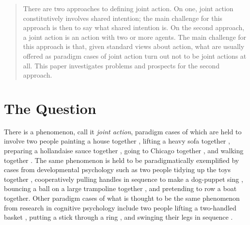 \documentclass[12pt,a4paper]{extarticle}
\begin{document}
\setlength\footnotesep{1em}


\maketitle

\begin{abstract}
There are two approaches to defining joint action.
On one, joint action constitutively involves shared intention; the main challenge for this approach is then to say what shared intention is.
On the second approach, a joint action is an action with two or more agents.  
The main challenge for this approach is that, given standard views about action, what are usually offered as paradigm cases of joint action turn out not to be joint actions at all.
This paper investigates problems and prospects for the second approach.



\end{abstract}




\section{The Question}
There is a phenomenon, call it \emph{joint action}, paradigm cases of which are held to involve two people 
	painting a house together \citep{Bratman:1992mi}, 
	lifting a heavy sofa together \citep{Velleman:1997oo}, 
	preparing a hollandaise sauce together \citep{Searle:1990em}, 
	going to Chicago together \citep{Kutz:2000si}, 
	and walking together \citep{gilbert_walking_1990}.
The same phenomenon is held to be paradigmatically exemplified by cases from developmental psychology such as two people 
	tidying up the toys together \citep{Behne:2005qh},
	cooperatively pulling handles in sequence to make a dog-puppet sing \citep{Brownell:2006gu},
	bouncing a ball on a large trampoline together \citep{Tomasello:2007gl},
	and pretending to row a boat together.
Other paradigm cases of what is thought to be the same phenomenon  from research in cognitive psychology include two people
	lifting a two-handled basket  \citep{Knoblich:2008hy},
	putting a stick through a ring \citep{ramenzoni_joint_2011},
	and swinging their legs in sequence \citep[p. 284]{schmidt_richardons:_2008}.
\end{document}
